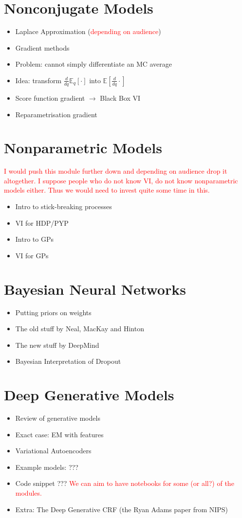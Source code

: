 \documentclass[11pt, a4paper]{article}
\newcommand{\wnote}[1]{\textcolor{red}{#1}}
\begin{document}
\section{Nonconjugate Models}
\begin{itemize}
\item Laplace Approximation (\wnote{depending on audience})
\item Gradient methods
\item Problem: cannot simply differentiate an MC average
\item Idea: transform $ \frac{d}{dq} \mathbb{E}_{q}[\cdot] $ into $ \mathbb{E}[\frac{d}{dq}\cdot] $
\item Score function gradient $ \rightarrow $ Black Box VI
\item Reparametrisation gradient
\end{itemize}

\section{Nonparametric Models}

\wnote{I would push this module further down and depending on audience drop it altogether. I suppose people who do not know VI, do not know nonparametric models either. Thus we would need to invest quite some time in this.}

\begin{itemize}
\item Intro to stick-breaking processes
\item VI for HDP/PYP
\item Intro to GPs
\item VI for GPs
\end{itemize}

\section{Bayesian Neural Networks}
\begin{itemize}
\item Putting priors on weights
\item The old stuff by Neal, MacKay and Hinton
\item The new stuff by DeepMind
\item Bayesian Interpretation of Dropout
\end{itemize}

\section{Deep Generative Models}
\begin{itemize}
\item Review of generative models
\item Exact case: EM with features
\item Variational Autoencoders
\item Example models: ???
\item Code snippet ??? \wnote{We can aim to have notebooks for some (or all?) of the modules.}
\item Extra: The Deep Generative CRF (the Ryan Adams paper from NIPS)
\end{itemize}
\end{document}
